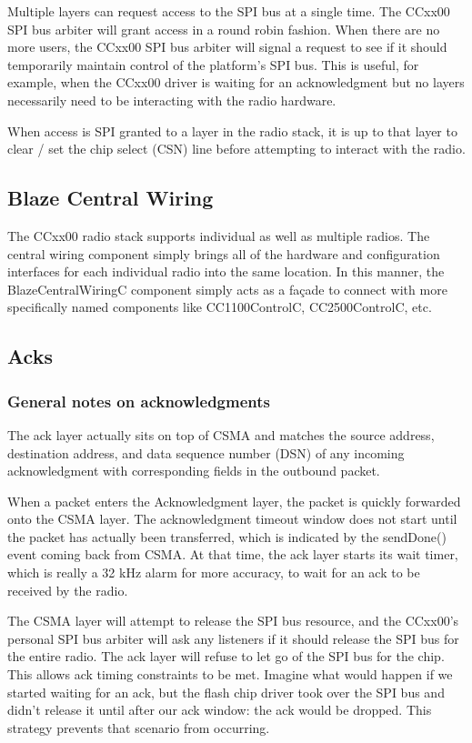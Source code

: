 \documentclass{article}
\begin{document}
Multiple layers can request access to the SPI bus at a single time. The CCxx00
SPI bus arbiter will grant access in a round robin fashion.  When there are no
more users, the CCxx00 SPI bus arbiter will signal a request to see if it
should temporarily maintain control of the platform's SPI bus. This is useful,
for example, when the CCxx00 driver is waiting for an acknowledgment but no layers
necessarily need to be interacting with the radio hardware.

When access is SPI granted to a layer in the radio stack, it is up to that layer
to clear / set the chip select (CSN) line before attempting to interact with the
radio.

\subsection{Blaze Central Wiring}
\label{sec:centralwiring}
The CCxx00 radio stack supports individual as well as multiple radios.  The 
central wiring component simply brings all of the hardware and configuration
interfaces for each individual radio into the same location.  In this manner,
the BlazeCentralWiringC component simply acts as a fa\c{c}ade to connect with
more specifically named components like CC1100ControlC, CC2500ControlC, etc.


\subsection{Acks}
\label{sec:acks}
\subsubsection{General notes on acknowledgments}
The ack layer actually sits on top of CSMA and matches the source address,
destination address, and data sequence number (DSN) of any incoming acknowledgment
with corresponding fields in the outbound packet.

When a packet enters the Acknowledgment layer, the packet is quickly forwarded
onto the CSMA layer. The acknowledgment timeout window does not start until the 
packet has actually been transferred, which is indicated by the sendDone() event
coming back from CSMA.  At that time, the ack layer starts its wait timer, which 
is really a 32 kHz alarm for more accuracy, to wait for an ack to be received by the radio.

The CSMA layer will attempt to release the SPI bus resource, and the CCxx00's personal SPI
bus arbiter will ask any listeners if it should release the SPI bus for the entire radio.
The ack layer will refuse to let go of the SPI bus for the chip.  This allows ack timing constraints
to be met. Imagine what would happen if we started waiting for an ack, but the flash chip driver
took over the SPI bus and didn't release it until after our ack window: the ack would be dropped.
This strategy prevents that scenario from occurring. 
\end{document}

